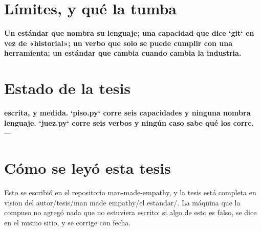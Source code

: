 \documentclass[11pt,a4paper]{article}
\begin{document}
\section{Límites, y qué la tumba}
\textbf{Un estándar que nombra su lenguaje; una capacidad que dice `git` en vez de «historial»; un verbo que solo se puede cumplir con una herramienta; un estándar que cambia cuando cambia la industria.}

\section{Estado de la tesis}
\textbf{escrita, y medida.} \textbf{`piso.py` corre seis capacidades y ninguna nombra lenguaje. `juez.py` corre seis verbos y ningún caso sabe qué los corre.} ---

\section*{Cómo se leyó esta tesis}
Esto se escribió en el repositorio man-made-empathy, y la tesis está completa en vision del autor/tesis/man made empathy/el estandar/. La máquina que la compuso no agregó nada que no estuviera escrito: si algo de esto es falso, se dice en el mismo sitio, y se corrige con fecha.
\end{document}
